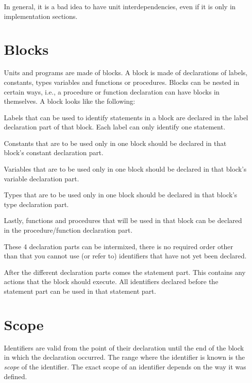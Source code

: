 In general, it is a bad idea to have unit interdependencies, even if it is
only in implementation sections.

\section{Blocks}
Units and programs are made of blocks. A block is made of declarations of
labels, constants, types variables and functions or procedures. Blocks can
be nested in certain ways, i.e., a procedure or function declaration can
have blocks in themselves.
A block looks like the following:

Labels that can be used to identify statements in a block are declared in
the label declaration part of that block. Each label can only identify one
statement.

Constants that are to be used only in one block should be declared in that
block's constant declaration part.

Variables that are to be used only in one block should be declared in that
block's variable declaration part.

Types that are to be used only in one block should be declared in that
block's type declaration part.

Lastly, functions and procedures that will be used in that block can be
declared in the procedure/function declaration part.

These 4 declaration parts can be intermixed, there is no required order
other than that you cannot use (or refer to) identifiers that have not 
yet been declared.

After the different declaration parts comes the statement part. This
contains any actions that the block should execute. All identifiers 
declared before the statement part can be used in that statement part.

\section{Scope}
Identifiers are valid from the point of their declaration until the end of
the block in which the declaration occurred. The range where the identifier
is known is the {\em scope} of the identifier. The exact scope of an
identifier depends on the way it was defined.
